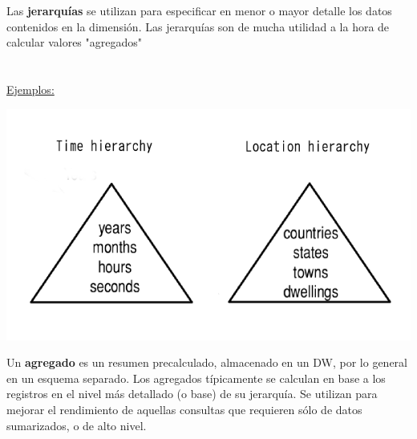 \documentclass{fancyslides}
\begin{document}
\begin{frame}
\end{frame}

\begin{frame}
\misc
{
  Las \textbf{jerarquías} se utilizan para especificar en menor o mayor detalle los datos contenidos en la dimensión. Las jerarquías son de mucha utilidad a la hora de calcular valores "agregados"\\ \ \\ \ \\

  \underline{Ejemplos:}
  \begin{center}
  \includegraphics[scale=0.3]{jerarquias}
  \end{center}
}
\end{frame}


\begin{frame}
\end{frame}

\begin{frame}
\misc
{
Un \textbf{agregado} es un resumen precalculado, almacenado en un DW, por lo general en un esquema separado.
Los agregados típicamente se calculan en base a los registros en el nivel más detallado (o base) de su jerarquía. Se utilizan para mejorar el rendimiento de aquellas consultas que requieren sólo de datos sumarizados, o de alto nivel.
}
\end{frame}
\end{document}
